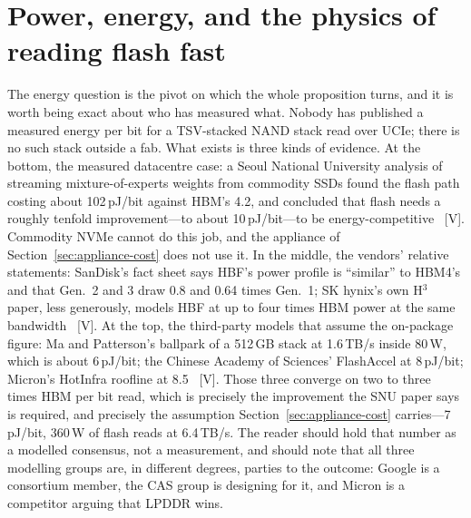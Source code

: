 \section{Power, energy, and the physics of reading flash fast}

The energy question is the pivot on which the whole proposition turns, and it is worth being exact about who has measured what. Nobody has published a measured energy per bit for a TSV-stacked NAND stack read over UCIe; there is no such stack outside a fab. What exists is three kinds of evidence. At the bottom, the measured datacentre case: a Seoul National University analysis of streaming mixture-of-experts weights from commodity SSDs found the flash path costing about 102\,pJ/bit against HBM's 4.2, and concluded that flash needs a roughly tenfold improvement---to about 10\,pJ/bit---to be energy-competitive~\cite{ssd-energy} [V]. Commodity NVMe cannot do this job, and the appliance of Section~\ref{sec:appliance-cost} does not use it. In the middle, the vendors' relative statements: SanDisk's fact sheet says HBF's power profile is ``similar'' to HBM4's and that Gen.\ 2 and 3 draw 0.8 and 0.64 times Gen.\ 1; SK hynix's own H$^3$ paper, less generously, models HBF at up to four times HBM power at the same bandwidth~\cite{sandisk-hbf-facts,hbf-h3} [V]. At the top, the third-party models that assume the on-package figure: Ma and Patterson's ballpark of a 512\,GB stack at 1.6\,TB/s inside 80\,W, which is about 6\,pJ/bit; the Chinese Academy of Sciences' FlashAccel at 8\,pJ/bit; Micron's HotInfra roofline at 8.5~\cite{hbf-ma-patterson,hbf-flashaccel,hbf-micron-hotinfra} [V]. Those three converge on two to three times HBM per bit read, which is precisely the improvement the SNU paper says is required, and precisely the assumption Section~\ref{sec:appliance-cost} carries---7\,pJ/bit, 360\,W of flash reads at 6.4\,TB/s. The reader should hold that number as a modelled consensus, not a measurement, and should note that all three modelling groups are, in different degrees, parties to the outcome: Google is a consortium member, the CAS group is designing for it, and Micron is a competitor arguing that LPDDR wins.

